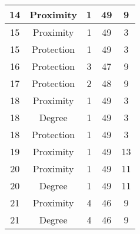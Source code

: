 \documentclass[results.tex]{subfiles}
\begin{document}
\begin{center}
\begin{tabular}{| c || c | c | c | c |}
            \hline
            14                      & Proximity                    & 1                      & 49                      & 9                    \\
            \hline
            15                      & Proximity                    & 1                      & 49                      & 3                    \\
            \hline
            15                      & Protection                   & 1                      & 49                      & 3                    \\
            \hline
            16                      & Protection                   & 3                      & 47                      & 9                    \\
            \hline
            17                      & Protection                   & 2                      & 48                      & 9                    \\
            \hline
            18                      & Proximity                    & 1                      & 49                      & 3                    \\
            \hline
            18                      & Degree                       & 1                      & 49                      & 3                    \\
            \hline
            18                      & Protection                   & 1                      & 49                      & 3                    \\
            \hline
            19                      & Proximity                    & 1                      & 49                      & 13                   \\
            \hline
            20                      & Proximity                    & 1                      & 49                      & 11                   \\
            \hline
            20                      & Degree                       & 1                      & 49                      & 11                   \\
            \hline
            21                      & Proximity                    & 4                      & 46                      & 9                    \\
            \hline
            21                      & Degree                       & 4                      & 46                      & 9                    \\

\end{tabular}
\end{center}
\end{document}

